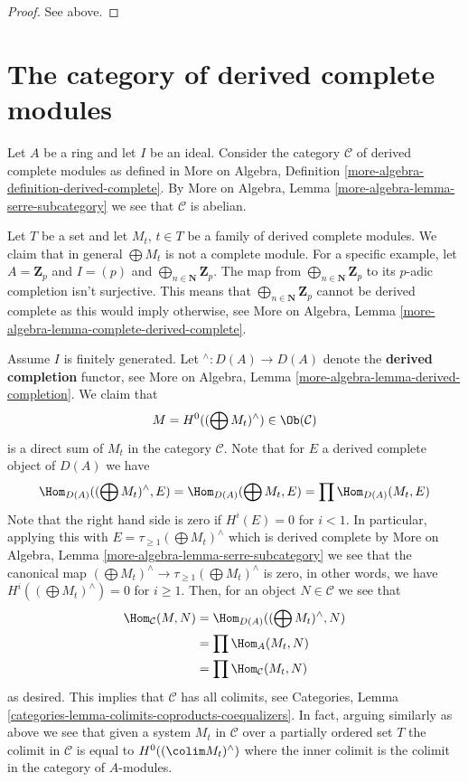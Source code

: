 \begin{proof}
See above.
\end{proof}





\section{The category of derived complete modules}
\label{section-derived-complete-modules}

\noindent
Let $A$ be a ring and let $I$ be an ideal. Consider the category
$\mathcal{C}$ of derived complete modules as defined in
More on Algebra, Definition \ref{more-algebra-definition-derived-complete}.
By More on Algebra, Lemma \ref{more-algebra-lemma-serre-subcategory}
we see that $\mathcal{C}$ is abelian.

\medskip\noindent
Let $T$ be a set and let $M_t$, $t \in T$ be a family of derived complete
modules. We claim that in general $\bigoplus M_t$ is not a complete module.
For a specific example, let $A = \mathbf{Z}_p$ and $I = (p)$ and
$\bigoplus_{n \in \mathbf{N}} \mathbf{Z}_p$. The map from
$\bigoplus_{n \in \mathbf{N}} \mathbf{Z}_p$ to its $p$-adic completion
isn't surjective. This means that $\bigoplus_{n \in \mathbf{N}} \mathbf{Z}_p$
cannot be derived complete as this would imply otherwise, see
More on Algebra, Lemma \ref{more-algebra-lemma-complete-derived-complete}.

\medskip\noindent
Assume $I$ is finitely generated. Let ${}^\wedge : D(A) \to D(A)$ denote
the {\bf derived completion} functor, see
More on Algebra, Lemma \ref{more-algebra-lemma-derived-completion}.
We claim that
$$
M = H^0((\bigoplus M_t)^\wedge) \in \Ob(\mathcal{C})
$$
is a direct sum of $M_t$ in the category $\mathcal{C}$. Note that
for $E$ a derived complete object of $D(A)$ we have
$$
\Hom_{D(A)}((\bigoplus M_t)^\wedge, E) =
\Hom_{D(A)}(\bigoplus M_t, E) =
\prod \Hom_{D(A)}(M_t, E)
$$
Note that the right hand side is zero if $H^i(E) = 0$ for $i < 1$.
In particular, applying this with $E = \tau_{\geq 1} (\bigoplus M_t)^\wedge$
which is derived complete by
More on Algebra, Lemma \ref{more-algebra-lemma-serre-subcategory}
we see that the canonical map
$(\bigoplus M_t)^\wedge \to \tau_{\geq 1}(\bigoplus M_t)^\wedge$
is zero, in other words, we have
$H^i((\bigoplus M_t)^\wedge) = 0$ for $i \geq 1$. Then, for
an object $N \in \mathcal{C}$ we see that
\begin{align*}
\Hom_\mathcal{C}(M, N)
& =
\Hom_{D(A)}((\bigoplus M_t)^\wedge, N)\\
& =
\prod \Hom_A(M_t, N) \\
& =
\prod \Hom_\mathcal{C}(M_t, N)
\end{align*}
as desired. This implies that $\mathcal{C}$ has all colimits, see
Categories, Lemma \ref{categories-lemma-colimits-coproducts-coequalizers}.
In fact, arguing similarly as above we see that given a system $M_t$
in $\mathcal{C}$ over a partially ordered set $T$ the colimit
in $\mathcal{C}$ is equal to $H^0((\colim M_t)^\wedge)$ where the inner
colimit is the colimit in the category of $A$-modules.

